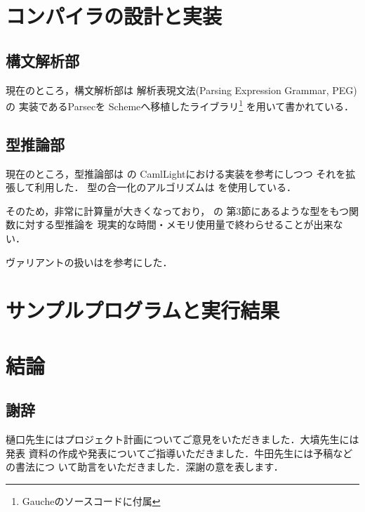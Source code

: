 \documentclass[a4paper,titlepage,report]{jsbook}
\begin{document}

\chapter{コンパイラの設計と実装}\label{ch:impl}

\begin{abstract}
\end{abstract}

\section{構文解析部}\label{sc:impl-parsing}
現在のところ，構文解析部は
解析表現文法(Parsing Expression Grammar, PEG)\cite{Ford:2004:PEG:982962.964011}の
実装であるParsec\cite{Hutton96monadicparser}を
Schemeへ移植したライブラリ\footnote{Gaucheのソースコードに付属}
を用いて書かれている．

\section{型推論部}\label{sc:impl-type-inference}
現在のところ，型推論部は
\algorithmW\cite{Milner1978348}\cite{Damas:1982:PTF:582153.582176}の
CamlLightにおける実装\cite{Lee:1998:PFL:291891.291892}を参考にしつつ
それを拡張して利用した．
型の合一化のアルゴリズムは
\algorithmU\cite{DBLP:books/el/RV01/BaaderS01}
を使用している．

そのため，非常に計算量が大きくなっており，
\cite{DBLP:journals/jfp/HengleinM94}の
第3節にあるような型をもつ関数に対する型推論を
現実的な時間・メモリ使用量で終わらせることが出来ない．

ヴァリアントの扱いは\cite{DBLP:conf/ctcs/Hagino87}を参考にした．


\chapter{サンプルプログラムと実行結果}\label{ch:sample-program}

\chapter{結論}\label{ch:conclude}

\section*{謝辞}
樋口先生にはプロジェクト計画についてご意見をいただきました．大墳先生には発表
資料の作成や発表についてご指導いただきました．牛田先生には予稿などの書法につ
いて助言をいただきました．深謝の意を表します．




\backmatter
\appendix
\end{document}
